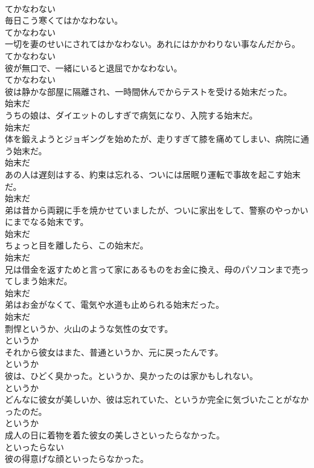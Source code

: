\documentclass[8pt]{extreport}
\begin{document}
\begin{CJK}{UTF8}{min}
\\	てかなわない
\\	毎日こう寒くてはかなわない。	
\\	てかなわない
\\	一切を妻のせいにされてはかなわない。あれにはかかわりない事なんだから。	
\\	てかなわない
\\	彼が無口で、一緒にいると退屈でかなわない。	
\\	てかなわない
\\	彼は静かな部屋に隔離され、一時間休んでからテストを受ける始末だった。	
\\	始末だ
\\	うちの娘は、ダイエットのしすぎで病気になり、入院する始末だ。	
\\	始末だ
\\	体を鍛えようとジョギングを始めたが、走りすぎて膝を痛めてしまい、病院に通う始末だ。	
\\	始末だ
\\	あの人は遅刻はする、約束は忘れる、ついには居眠り運転で事故を起こす始末だ。	
\\	始末だ
\\	弟は昔から両親に手を焼かせていましたが、ついに家出をして、警察のやっかいにまでなる始末です。	
\\	始末だ
\\	ちょっと目を離したら、この始末だ。	
\\	始末だ
\\	兄は借金を返すためと言って家にあるものをお金に換え、母のパソコンまで売ってしまう始末だ。	
\\	始末だ
\\	弟はお金がなくて、電気や水道も止められる始末だった。	
\\	始末だ
\\	剽悍というか、火山のような気性の女です。	
\\	というか
\\	それから彼女はまた、普通というか、元に戻ったんです。	
\\	というか
\\	彼は、ひどく臭かった。というか、臭かったのは家かもしれない。	
\\	というか
\\	どんなに彼女が美しいか、彼は忘れていた、というか完全に気づいたことがなかったのだ。	
\\	というか
\\	成人の日に着物を着た彼女の美しさといったらなかった。	
\\	といったらない
\\	彼の得意げな顔といったらなかった。	

\end{CJK}
\end{document}
